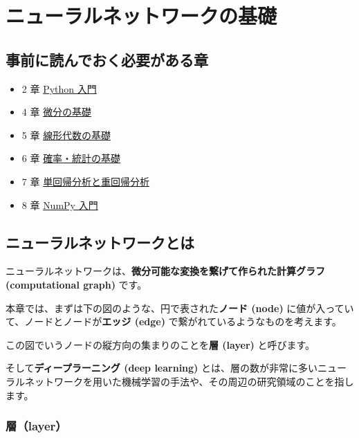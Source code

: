 \chapter{ニューラルネットワークの基礎}


\section{事前に読んでおく必要がある章}


\begin{itemize}
\item 2 章 \href{https://tutorials.chainer.org/ja/02_Basics_of_Python.html}{Python 入門}
\item 4 章 \href{https://tutorials.chainer.org/ja/04_Basics_of_Differential.html}{微分の基礎}
\item 5 章 \href{https://tutorials.chainer.org/ja/05_Basics_of_Linear_Algebra.html}{線形代数の基礎}
\item 6 章 \href{https://tutorials.chainer.org/ja/06_Basics_of_Probability_Statistics.html}{確率・統計の基礎}
\item 7 章 \href{https://tutorials.chainer.org/ja/07_Regression_Analysis.html}{単回帰分析と重回帰分析}
\item 8 章 \href{https://tutorials.chainer.org/ja/08_Introduction_to_NumPy.html}{NumPy 入門}
\end{itemize}


\section{ニューラルネットワークとは}


ニューラルネットワークは、\textbf{微分可能な変換を繋げて作られた計算グラフ (computational graph)} です。

本章では、まずは下の図のような、円で表された\textbf{ノード (node)} に値が入っていて、ノードとノードが\textbf{エッジ (edge)} で繋がれているようなものを考えます。


この図でいうノードの縦方向の集まりのことを\textbf{層 (layer)} と呼びます。

そして\textbf{ディープラーニング (deep learning)} とは、層の数が非常に多いニューラルネットワークを用いた機械学習の手法や、その周辺の研究領域のことを指します。




\subsection{層（layer）}


